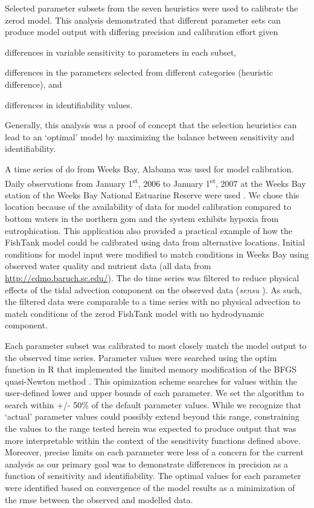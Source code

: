 \documentclass[preprint]{elsarticle}\usepackage[]{graphicx}\usepackage[]{color}
\begin{document}
Selected parameter subsets from the seven heuristics were used to calibrate the \ac{zerod} model.  This analysis demonstrated that different parameter sets can produce model output with differing precision and calibration effort given
\begin{inparaenum}[1\upshape)]
\item differences in variable sensitivity to parameters in each subset, 
\item differences in the parameters selected from different categories (heuristic difference), and 
\item differences in identifiability values.
\end{inparaenum}
Generally, this analysis was a proof of concept that the selection heuristics can lead to an `optimal' model by maximizing the balance between sensitivity and identifiability.  

A time series of \ac{do} from Weeks Bay, Alabama was used for model calibration.  Daily observations from January 1\textsuperscript{st},  2006 to January 1\textsuperscript{st}, 2007 at the Weeks Bay station of the Weeks Bay National Estuarine Reserve were used \citep{Wenner04}.  We chose this location because of the availability of data for model calibration compared to bottom waters in the northern \ac{gom} and the system exhibits hypoxia from eutrophication.  This application also provided a practical example of how the FishTank model could be calibrated using data from alternative locations.  Initial conditions for model input were modified to match conditions in Weeks Bay using observed water quality and nutrient data (all data from \url{http://cdmo.baruch.sc.edu/}).  The \ac{do} time series was filtered to reduce physical effects of the tidal advection component on the observed data (\textit{sensu} \citealt{Beck15b}).  As such, the filtered data were comparable to a time series with no physical advection to match conditions of the \ac{zerod} FishTank model with no hydrodynamic component. 

Each parameter subset was calibrated to most closely match the model output to the observed time series.  Parameter values were searched using the optim function in R that implemented the limited memory modification of the BFGS quasi-Newton method \citep{Byrd95,Nocedal06,RDCT17}.  This opimization scheme searches for values within the user-defined lower and upper bounds of each parameter.  We set the algorithm to search within +/- 50\% of the default parameter values.  While we recognize that `actual' parameter values could possibly extend beyond this range, constraining the values to the range tested herein was expected to produce output that was more interpretable within the context of the sensitivity functions defined above.  Moreover, precise limits on each parameter were less of a concern for the current analysis as our primary goal was to demonstrate differences in precision as a function of sensitivity and identifiability.  The optimal values for each parameter were identified based on convergence of the model results as a minimization of the \ac{rmse} between the observed and modelled data.    
\end{document}
